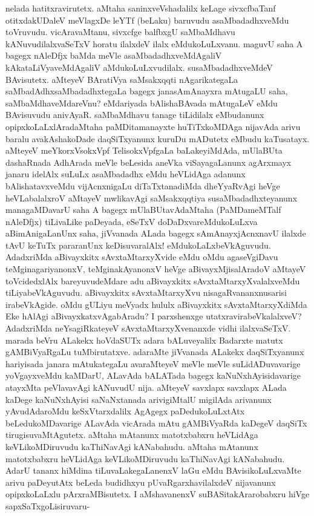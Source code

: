 nelada hatitxravirutetx. aMtaha saninxveVshadalilx keLage sivxcfbaTanf otitxdakUDaleV meVlagxDe leYTf (beLaku) baruvudu asaMbadadhxveMdu toVruvudu. vicAravaMtanu, \hbox{sivxcfge} balfbxgU saMbaMdhavu kANuvudilalxvaSeTxV horatu ilalxdeV ilalx eMdukoLuLxvanu. maguvU saha A bagegx nAleDfjx baMda meVle asaMbadadhxveMdAgaliV kAkataLiVyaveMdAgaliV aMdukoLuLxvudilalx. susaMbadadhxveMdeV BAvisutetx. aMteyeV BAratiVya saMsakxqqti nAgarikategaLa saMbadAdhxsaMbadadhxtegaLa bagegx janasAmAnayxra mAtugaLU saha, saMbaMdhaveMdareVnu? eMdariyada bAlishaBAvada mAtugaLeV eMdu BAvisuvudu anivAyaR. saMbaMdhavu tanage tiLidilalx eMbudanunx opipxkoLaLxlAradaMtaha paMDitamanayxte huTiTxkoMDAga nijavAda arivu baralu avakAshakoDade daqSiTxyanunx kuruDu mADutetx  eMbudu kaTusatayx. aMteyeV meYkorxVsokxVpf TelisokxVpfgaLa baLakeyiMdAda, mUlaBUta dashaRnada AdhArada meVle beLesida aneVka viSayagaLanunx agArxmayx janaru idelAlx suLuLx asaMbadadhx eMdu heVLidAga adanunx bAlishatavxveMdu vijAcnxnigaLu diTaTxtanadiMda dheYyaRvAgi heVge heVLabalalxroV aMtayeV mwlikavAgi saMsakxqqtiya susaMbadadhxteyanunx managaMDavarU saha A bagegx mUlaBUtavAdaMtaha (PaMDameMTalf nAleDfjx) tiLivaLike paDeyada, eSeTxV doDaDxvareMdukoLuLxva aBimAnigaLanUnx saha, jiVvanada ALada bagegx sAmAnayxjAcnxnavU ilalxde tAvU keTuTx pararanUnx keDisuvaralAlx! eMdukoLaLxbeVkAguvudu. AdadxriMda aBivayxkitx sAvxtaMtarxyXvide eMdu oMdu agaseVgiDavu teMginagariyanonxV, teMginakAyanonxV heVge aBivayxMjisalAradoV aMtayeV toVcidedxlAlx bareyuvudeMdare adu aBivayxkitx sAvxtaMtarxyXvalalxveMdu tiLiyabeVkAguvudu. aBivayxkitx sAvxtaMtarxyXvu nisagaRvananxnusarisi irabeVkAgide. oMdu gULiyu meVyadx hululx aBivayxkitx sAvxtaMtarxyXdiMda Eke hAlAgi aBivayxkatxvAgabAradu? I parxshenxge utatxravirabeVkalalxveV? AdadxriMda neYsagiRkateyeV sAvxtaMtarxyXvenanxde vidhi ilalxvaSeTxV. marada beVru ALakekx hoVdaSUTx adara bALuveyalilx Badarxte matutx gAMBiVyaRgaLu tuMbirutatxve. adaraMte jiVvanada ALakekx daqSiTxyanunx hariyisada janara mAtukategaLu avaraMteyeV meVle meVle suLidADuvavarige yoVgayxveMdu kaMDarU, ALavAda bALATada bagegx kaNuNxhAyisidavarige atayxMta peVlavavAgi kANuvudU nija. aMteyeV savxlapx savxlapx ALada kaDege kaNuNxhAyisi saNaNxtanada arivigiMtalU migilAda arivanunx yAvudAdaroMdu keSxVtarxdalilx AgAgegx paDedukoLuLxtAtx beLedukoMDavarige ALavAda vicArada mAtu gAMBiVyaRda kaDegeV daqSiTx tirugisuvaMtAgutetx. aMtaha mAtanunx matotxbabxru heVLidAga keVLikoMDiruvudu kaThiNavAgi kANabahudu. aMtaha mAtanunx matotxbabxru heVLidAga keVLikoMDiruvudu kaThiNavAgi kANabahudu. AdarU tananx hiMdina tiLuvaLakegaLanenxV laGu eMdu BAvisikoLuLxvaMte arivu paDeyutAtx beLeda budidhxyu pUvaRgarxhavilalxdeV nijavanunx opipxkoLaLxlu pArxraMBisutetx. I aMshavanenxV suBASitakArarobabxru hiVge sapxSaTxgoLisiruvaru-

